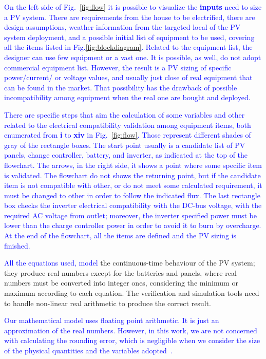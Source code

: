 \documentclass[runningheads]{llncs}
\begin{document}
\textcolor{blue}{On the left side of Fig.~\ref{fig:flow} it is possible to visualize the \textbf{inputs} need to size a PV system. There are requirements from the house to be electrified, there are design assumptions, weather information from the targeted local of the PV system deployment, and a possible initial list of equipment to be used, covering all the items listed in Fig.\ref{fig:blockdiagram}. Related to the equipment list, the designer can use few equipment or a vast one. It is possible, as well, do not adopt commercial equipment list. However, the result is a PV sizing of specific power/current/ or voltage values, and usually just close of real equipment that can be found in the market. That possibility has the drawback of possible incompatibility among equipment when the real one are bought and deployed.}

\textcolor{blue}{There are specific steps that aim the calculation of some variables and other related to the electrical compatibility validation among equipment items, both enumerated from \textbf{i} to \textbf{xiv} in Fig.~\ref{fig:flow}. Those represent different shades of gray of the  rectangle boxes. The start point usually is a candidate list of PV panels, change controller, battery, and inverter, as indicated at the top of the flowchart. The arrows, in the right side, it shows a point where some specific item is validated. The flowchart do not shows the returning point, but if the candidate item is not compatible with other, or do not meet some calculated requirement, it must be changed to other in order to follow the indicated flux. The last rectangle box checks the inverter electrical compatibility with the DC-bus voltage, with the required AC voltage from outlet; moreover, the inverter specified power must be lower than the charge controller power in order to avoid it to burn by overcharge. At the end of the flowchart, all the items are defined and the PV sizing is finished.}

\textcolor{blue}{All the equations used, model} the continuous-time behaviour of the PV system; they produce real numbers except for the batteries and panels, where real numbers must be converted into integer ones, considering the minimum or maximum according to each equation. The verification and simulation tools need to handle non-linear real arithmetic to produce the correct result.

\textcolor{blue}{Our mathematical model uses floating point arithmetic. It is just an approximation of the real numbers. However, in this work, we are not concerned with calculating the rounding error, which is negligible when we consider the size of the physical quantities and the variables adopted~\cite{DBLP:journals/corr/abs-2004-12699}.}
\end{document}
